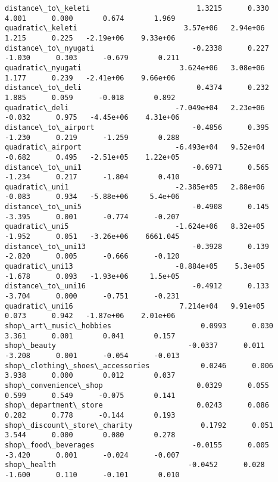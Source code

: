 \documentclass[11pt]{article}
\begin{document}
\begin{Verbatim}[commandchars=\\\{\}]
distance\_to\_keleti                         1.3215      0.330      4.001      0.000       0.674       1.969
quadratic\_keleti                         3.57e+06   2.94e+06      1.215      0.225   -2.19e+06    9.33e+06
distance\_to\_nyugati                       -0.2338      0.227     -1.030      0.303      -0.679       0.211
quadratic\_nyugati                       3.624e+06   3.08e+06      1.177      0.239   -2.41e+06    9.66e+06
distance\_to\_deli                           0.4374      0.232      1.885      0.059      -0.018       0.892
quadratic\_deli                         -7.049e+04   2.23e+06     -0.032      0.975   -4.45e+06    4.31e+06
distance\_to\_airport                       -0.4856      0.395     -1.230      0.219      -1.259       0.288
quadratic\_airport                      -6.493e+04   9.52e+04     -0.682      0.495   -2.51e+05    1.22e+05
distance\_to\_uni1                          -0.6971      0.565     -1.234      0.217      -1.804       0.410
quadratic\_uni1                         -2.385e+05   2.88e+06     -0.083      0.934   -5.88e+06     5.4e+06
distance\_to\_uni5                          -0.4908      0.145     -3.395      0.001      -0.774      -0.207
quadratic\_uni5                         -1.624e+06   8.32e+05     -1.952      0.051   -3.26e+06    6661.045
distance\_to\_uni13                         -0.3928      0.139     -2.820      0.005      -0.666      -0.120
quadratic\_uni13                        -8.884e+05    5.3e+05     -1.678      0.093   -1.93e+06     1.5e+05
distance\_to\_uni16                         -0.4912      0.133     -3.704      0.000      -0.751      -0.231
quadratic\_uni16                         7.214e+04   9.91e+05      0.073      0.942   -1.87e+06    2.01e+06
shop\_art\_music\_hobbies                     0.0993      0.030      3.361      0.001       0.041       0.157
shop\_beauty                               -0.0337      0.011     -3.208      0.001      -0.054      -0.013
shop\_clothing\_shoes\_accessories            0.0246      0.006      3.938      0.000       0.012       0.037
shop\_convenience\_shop                      0.0329      0.055      0.599      0.549      -0.075       0.141
shop\_department\_store                      0.0243      0.086      0.282      0.778      -0.144       0.193
shop\_discount\_store\_charity                0.1792      0.051      3.544      0.000       0.080       0.278
shop\_food\_beverages                       -0.0155      0.005     -3.420      0.001      -0.024      -0.007
shop\_health                               -0.0452      0.028     -1.600      0.110      -0.101       0.010

\end{Verbatim}
\end{document}
